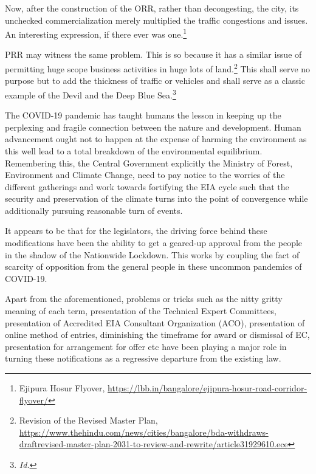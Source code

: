 \begin{multicols}{2}
\noi
Now, after the construction of the ORR, rather than decongesting, the city, its unchecked
commercialization merely multiplied the traffic congestions and issues. An interesting
expression, if there ever was one.\footnote{Ejipura Hosur Flyover, \url{https://lbb.in/bangalore/ejipura-hosur-road-corridor-flyover/}}

\noi
PRR may witness the same problem. This is so because it has a similar issue of permitting
huge scope business activities in huge lots of land.\footnote{Revision of the Revised Master Plan,\\ \url{https://www.thehindu.com/news/cities/bangalore/bda-withdraws-draftrevised-master-plan-2031-to-review-and-rewrite/article31929610.ece}} This shall serve no purpose but to add the thickness of traffic or vehicles and shall serve as a classic example of the Devil and the Deep
Blue Sea.\footnote{\textit{Id.}}



\vspace{-.1cm}

\noi
The COVID-19 pandemic has taught humans the lesson in keeping up the perplexing and
fragile connection between the nature and development. Human advancement ought not to
happen at the expense of harming the environment as this well lead to a total breakdown of
the environmental equilibrium. Remembering this, the Central Government explicitly the
Ministry of Forest, Environment and Climate Change, need to pay notice to the worries of the
different gatherings and work towards fortifying the EIA cycle such that the security and
preservation of the climate turns into the point of convergence while additionally pursuing
reasonable turn of events.

\vspace{-.2cm}

\noi
It appears to be that for the legislators, the driving force behind these modifications have been
the ability to get a geared-up approval from the people in the shadow of the Nationwide
Lockdown. This works by coupling the fact of scarcity of opposition from the general people
in these uncommon pandemics of COVID-19.

\noi
Apart from the aforementioned, problems or tricks such as the nitty gritty meaning of each
term, presentation of the Technical Expert Committees, presentation of Accredited EIA
Consultant Organization (ACO), presentation of online method of entries, diminishing the
timeframe for award or dismissal of EC, presentation for arrangement for offer etc have been
playing a major role in turning these notifications as a regressive departure from the existing
law. 


\end{multicols}

